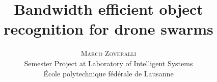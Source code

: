 \documentclass[10pt,conference,compsocconf]{IEEEtran}
\begin{document}
	
\pretitle{\begin{center}\Huge\bfseries} %
\posttitle{\end{center}} %
\title{Bandwidth efficient object recognition for drone swarms}

\author{
	\textsc{Marco Zoveralli} \\
	\normalsize{Semester Project at Laboratory of Intelligent Systems} \\
	\normalsize \'{E}cole polytechnique f\'{e}d\'{e}rale de Lausanne
}




\onecolumn
\maketitle
\end{document}
